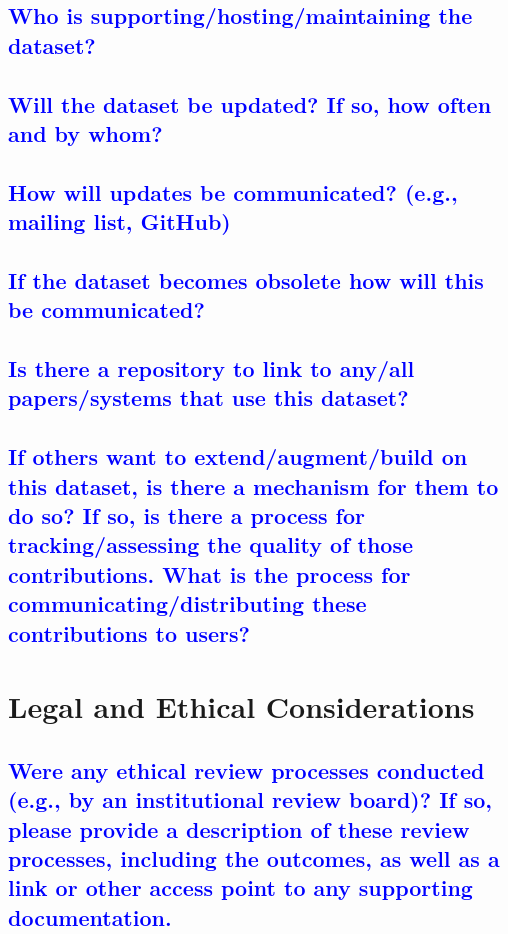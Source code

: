 \documentclass[letterpaper, 10 pt, conference]{ieeeconf}  %
\begin{document}
\textcolor{blue}{\subsection{Who is supporting/hosting/maintaining the
dataset?}}
\lipsum[1]

\textcolor{blue}{\subsection{Will the dataset be updated? If so, how often and
by whom?}}
\lipsum[1]

\textcolor{blue}{\subsection{How will updates be communicated? (e.g., mailing
list, GitHub)}}
\lipsum[1]

\textcolor{blue}{\subsection{If the dataset becomes obsolete how will this be
communicated?}}
\lipsum[1]

\textcolor{blue}{\subsection{Is there a repository to link to any/all papers/systems that use this dataset?}}
\lipsum[1]

\textcolor{blue}{\subsection{If others want to extend/augment/build on this
dataset, is there a mechanism for them to do so?
If so, is there a process for tracking/assessing the
quality of those contributions. What is the process
for communicating/distributing these contributions
to users?}}
\lipsum[1]

\section{Legal and Ethical Considerations}

\textcolor{blue}{\subsection{Were any ethical review processes conducted (e.g., by an institutional review board)? If so, please provide a description of these review
processes, including the outcomes, as well as a link or other access point
to any supporting documentation.}}
\lipsum[1]
\end{document}
